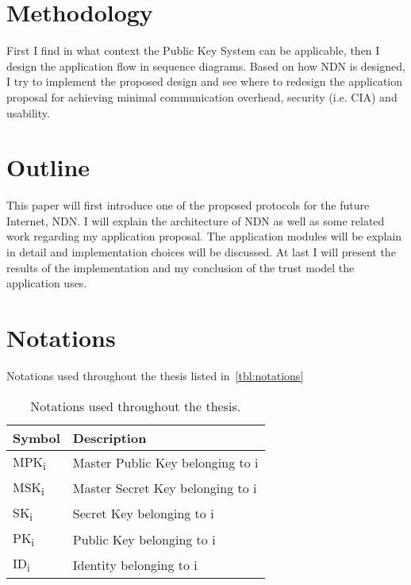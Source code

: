 \section{Methodology}

First I find in what context the Public Key System can be applicable, then I design the application flow in sequence diagrams.
Based on how \gls{NDN} is designed, I try to implement the proposed design and see where to redesign the application proposal for achieving minimal communication overhead, security (i.e. \gls{CIA}) and usability.

\section{Outline}

This paper will first introduce one of the proposed protocols for the future Internet, \gls{NDN}.
I will explain the architecture of \gls{NDN} as well as some related work regarding my application proposal. 
The application modules will be explain in detail and implementation choices will be discussed.
At last I will present the results of the implementation and my conclusion of the trust model the application uses.

\section{Notations}
Notations used throughout the thesis listed in~\autoref{tbl:notations}
\begin{table}[h]
  \begin{tabular}[c]{p{}p{}}
  \hline
  Symbol                    & Description                           \\ \hline
  MPK\textsubscript{i}      & Master Public Key belonging to i      \\ %
  MSK\textsubscript{i}      & Master Secret Key belonging to i      \\ %
  SK\textsubscript{i}       & Secret Key belonging to i             \\ %
  PK\textsubscript{i}       & Public Key belonging to i             \\ %
  ID\textsubscript{i}       & Identity belonging to i               \\ %
  \end{tabular}
  \caption{Notations used throughout the thesis.}
  \label{tbl:notations}
\end{table}